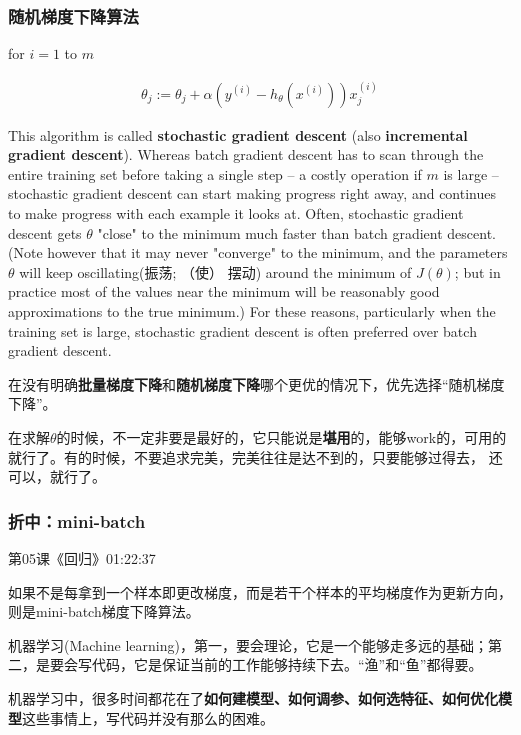 \documentclass[UTF8]{ctexart}
\begin{document}
 \subsubsection{随机梯度下降算法}

 for $i=1$ to $m$

 \begin{equation}
\begin{aligned}
\theta_{j} := \theta_{j}+\alpha  (y^{(i)}-h_{\theta}(x^{(i)}))x^{(i)}_{j}
\end{aligned}
\end{equation}

This algorithm is called \textbf{stochastic gradient descent} (also \textbf{incremental gradient descent}).  Whereas batch gradient descent has to scan through the entire training set before taking a single step -- a costly operation if $m$ is large -- stochastic gradient descent can start making progress right away, and continues to make progress with each example it looks at. Often, stochastic gradient descent gets $\theta$ "close" to the minimum much faster than batch gradient descent. (Note however that it may never "converge" to the minimum, and the parameters $\theta$ will keep oscillating(振荡; （使） 摆动) around the minimum of $J(\theta)$; but in practice most of the values near the minimum will be reasonably good approximations to the true minimum.) For these reasons, particularly when the training set is large, stochastic gradient descent is often preferred over batch gradient descent.

在没有明确\textbf{批量梯度下降}和\textbf{随机梯度下降}哪个更优的情况下，优先选择“随机梯度下降”。

在求解$\theta$的时候，不一定非要是最好的，它只能说是\textbf{堪用}的，能够work的，可用的就行了。有的时候，不要追求完美，完美往往是达不到的，只要能够过得去， 还可以，就行了。

\subsubsection{折中：mini-batch}

第05课《回归》01:22:37

如果不是每拿到一个样本即更改梯度，而是若干个样本的平均梯度作为更新方向，则是mini-batch梯度下降算法。

机器学习(Machine learning)，第一，要会理论，它是一个能够走多远的基础；第二，是要会写代码，它是保证当前的工作能够持续下去。“渔”和“鱼”都得要。

机器学习中，很多时间都花在了\textbf{如何建模型、如何调参、如何选特征、如何优化模型}这些事情上，写代码并没有那么的困难。
\end{document}
